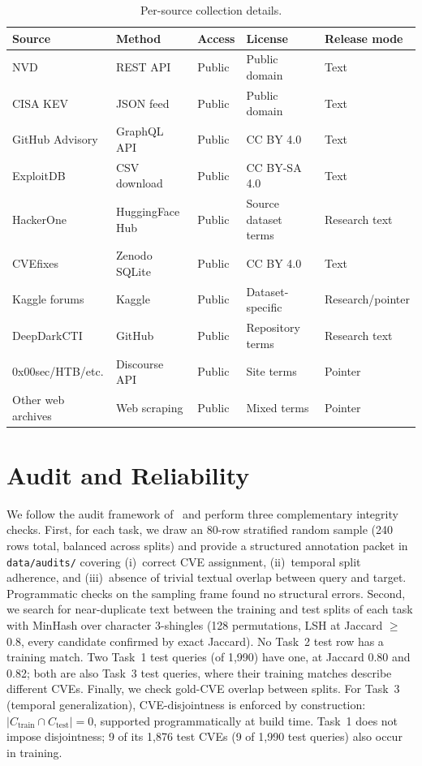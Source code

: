 \documentclass{article}
\begin{document}
\begin{table}[t]
\centering
\small
\caption{Per-source collection details.}
\label{tab:collection-details}
\begin{tabular}{lllll}
\toprule
\textbf{Source} & \textbf{Method} & \textbf{Access} & \textbf{License} & \textbf{Release mode} \\
\midrule
NVD             & REST API        & Public & Public domain & Text \\
CISA KEV        & JSON feed       & Public & Public domain & Text \\
GitHub Advisory & GraphQL API     & Public & CC BY 4.0 & Text \\
ExploitDB       & CSV download    & Public & CC BY-SA 4.0 & Text \\
HackerOne       & HuggingFace Hub & Public & Source dataset terms & Research text \\
CVEfixes        & Zenodo SQLite   & Public & CC BY 4.0 & Text \\
Kaggle forums   & Kaggle          & Public & Dataset-specific & Research/pointer \\
DeepDarkCTI     & GitHub          & Public & Repository terms & Research text \\
0x00sec/HTB/etc.& Discourse API   & Public & Site terms & Pointer \\
Other web archives & Web scraping & Public & Mixed terms & Pointer \\
\bottomrule
\end{tabular}
\end{table}

\section{Audit and Reliability}
\label{app:audit-reliability}

We follow the audit framework of~\citet{kapoor2023leakage} and perform three complementary integrity checks. First, for each task, we draw an 80-row stratified random sample (240 rows total, balanced across splits) and provide a structured annotation packet in \texttt{data/audits/} covering (i)~correct CVE assignment, (ii)~temporal split adherence, and (iii)~absence of trivial textual overlap between query and target. Programmatic checks on the sampling frame found no structural errors. Second, we search for near-duplicate text between the training and test splits of each task with MinHash over character 3-shingles (128 permutations, LSH at Jaccard $\geq$0.8, every candidate confirmed by exact Jaccard). No Task~2 test row has a training match. Two Task~1 test queries (of 1,990) have one, at Jaccard 0.80 and 0.82; both are also Task~3 test queries, where their training matches describe different CVEs. Finally, we check gold-CVE overlap between splits. For Task~3 (temporal generalization), CVE-disjointness is enforced by construction: $|C_{\text{train}} \cap C_{\text{test}}| = 0$, supported programmatically at build time. Task~1 does not impose disjointness; 9 of its 1,876 test CVEs (9 of 1,990 test queries) also occur in training.
\end{document}
